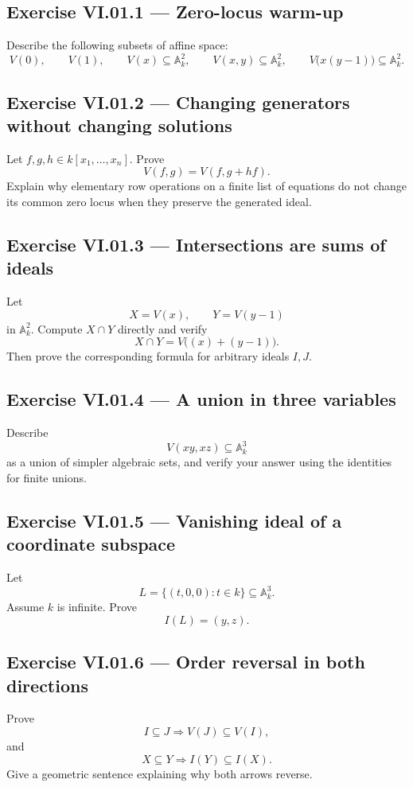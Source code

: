 
\subsection*{Exercise VI.01.1 --- Zero-locus warm-up}
\label{ex:vi01-1}
Describe the following subsets of affine space:
\[
V(0),\qquad V(1),\qquad V(x)\subseteq\mathbb A_k^2,
\qquad V(x,y)\subseteq\mathbb A_k^2,
\qquad V\bigl(x(y-1)\bigr)\subseteq\mathbb A_k^2.
\]

\subsection*{Exercise VI.01.2 --- Changing generators without changing solutions}
\label{ex:vi01-2}
Let \(f,g,h\in k[x_1,\dots,x_n]\).  Prove
\[
  V(f,g)=V(f,g+hf).
\]
Explain why elementary row operations on a finite list of equations do not change its
common zero locus when they preserve the generated ideal.

\subsection*{Exercise VI.01.3 --- Intersections are sums of ideals}
\label{ex:vi01-3}
Let
\[
  X=V(x),
  \qquad
  Y=V(y-1)
\]
in \(\mathbb A_k^2\).  Compute \(X\cap Y\) directly and verify
\[
  X\cap Y=V\bigl((x)+(y-1)\bigr).
\]
Then prove the corresponding formula for arbitrary ideals \(I,J\).

\subsection*{Exercise VI.01.4 --- A union in three variables}
\label{ex:vi01-4}
Describe
\[
  V(xy,xz)\subseteq\mathbb A_k^3
\]
as a union of simpler algebraic sets, and verify your answer using the identities for
finite unions.

\subsection*{Exercise VI.01.5 --- Vanishing ideal of a coordinate subspace}
\label{ex:vi01-5}
Let
\[
  L=\{(t,0,0):t\in k\}\subseteq\mathbb A_k^3.
\]
Assume \(k\) is infinite.  Prove
\[
  I(L)=(y,z).
\]

\subsection*{Exercise VI.01.6 --- Order reversal in both directions}
\label{ex:vi01-6}
Prove
\[
  I\subseteq J\Longrightarrow V(J)\subseteq V(I),
\]
and
\[
  X\subseteq Y\Longrightarrow I(Y)\subseteq I(X).
\]
Give a geometric sentence explaining why both arrows reverse.

